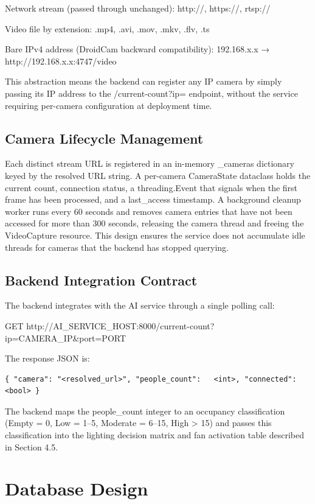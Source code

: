  Network stream (passed through unchanged): http://, https://, rtsp://

 Video file by extension: .mp4, .avi, .mov, .mkv, .flv, .ts

 Bare IPv4 address (DroidCam backward compatibility): 192.168.x.x →
http://192.168.x.x:4747/video

This abstraction means the backend can register any IP camera by simply passing its IP
address to the /current-count?ip= endpoint, without the service requiring per-camera
configuration at deployment time.

\subsection{Camera Lifecycle Management}


Each distinct stream URL is registered in an in-memory _cameras dictionary keyed by
the resolved URL string. A per-camera CameraState dataclass holds the current count,
connection status, a threading.Event that signals when the first frame has been
processed, and a last_access timestamp. A background cleanup worker runs every 60
seconds and removes camera entries that have not been accessed for more than 300
seconds, releasing the camera thread and freeing the VideoCapture resource. This design
ensures the service does not accumulate idle threads for cameras that the backend has
stopped querying.

\subsection{Backend Integration Contract}


The backend integrates with the AI service through a single polling call:

GET http://{AI_SERVICE_HOST}:8000/current-count?ip={CAMERA_IP}\&port={PORT}

The response JSON is:

\begin{lstlisting}
{ "camera": "<resolved_url>", "people_count":   <int>, "connected": <bool> }
\end{lstlisting}

The backend maps the people_count integer to an occupancy classification (Empty = 0,
Low = 1--5, Moderate = 6--15, High > 15) and passes this classification into the lighting
decision matrix and fan activation table described in Section 4.5.


\section{Database Design}



